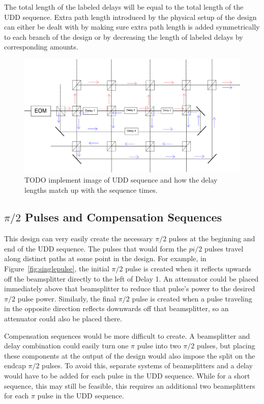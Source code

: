 \documentclass[pdftex,12pt,a4paper]{article}
\begin{document}
The total length of the labeled delays will be equal to the total length of the UDD sequence. Extra path length introduced by the physical setup of the design can either be dealt with by making sure extra path length is added symmetrically to each branch of the design or by decreasing the length of labeled delays by corresponding amounts.

\begin{figure}[H]
\centering
\includegraphics[width=\textwidth]{singlepulse.png}
\caption{TODO implement image of UDD sequence and how the delay lengths match up with the sequence times.}
\label{fig:UDDseqdelays}
\end{figure}

\subsection{$\pi/2$ Pulses and Compensation Sequences}
This design can very easily create the necessary $\pi/2$ pulses at the beginning and end of the UDD sequence. The pulses that would form the $pi/2$ pulses travel along distinct paths at some point in the design. For example, in Figure~\ref{fig:singlepulse}, the initial $\pi/2$ pulse is created when it reflects upwards off the beamsplitter directly to the left of Delay 1. An attenuator could be placed immediately above that beamsplitter to reduce that pulse's power to the desired $\pi/2$ pulse power. Similarly, the final $\pi/2$ pulse is created when a pulse traveling in the opposite direction reflects downwards off that beamsplitter, so an attenuator could also be placed there.

Compensation sequences would be more difficult to create. A beamsplitter and delay combination could easily turn one $\pi$ pulse into two $\pi/2$ pulses, but placing these components at the output of the design would also impose the split on the endcap $\pi/2$ pulses. To avoid this, separate systems of beamsplitters and a delay would have to be added for each pulse in the UDD sequence. While for a short sequence, this may still be feasible, this requires an additional two beamsplitters for each $\pi$ pulse in the UDD sequence.
\end{document}

